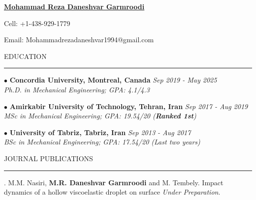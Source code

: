 \documentclass[11pt]{article}
\newcommand\tab[1][0.5cm]{\hspace*{#1}}
\begin{document}
	
	\noindent \href{https://mrdanesh.github.io/portfolio/}{{\textbf{Mohammad Reza Daneshvar Garmroodi}}} 
	
	\noindent Cell: +1-438-929-1779 
	
	\noindent Email: Mohammadrezadaneshvar1994@gmail.com 
	

	
	
	\vspace{3mm}
	
	
	\noindent EDUCATION
	
	\vspace{-2mm}
	
	\noindent\rule[0.5ex]{\linewidth}{1pt}
	
	
		{\noindent $\bullet$ \bf Concordia University, Montreal, Canada} \hfill {\em Sep 2019 - May 2025} 
		\\ \textit{Ph.D. in Mechanical Engineering; GPA: 4.1/4.3}
		
		\vspace{1.5mm}
		
		{\noindent $\bullet$ \bf Amirkabir University of Technology, Tehran, Iran} \hfill {\em Sep 2017 - Aug 2019} 
		\\ \textit{MSc in Mechanical Engineering; GPA: 19.54/20 (\textbf{Ranked 1st})}
	
		\vspace{1.5mm}
		
		{\noindent $\bullet$ \bf University of Tabriz, Tabriz, Iran} \hfill {\em Sep 2013 - Aug 2017} 
		\\ \textit{BSc in Mechanical Engineering; GPA: 17.54/20 (Last two years)}
		
		\vspace{2.5mm}
		
		\noindent JOURNAL PUBLICATIONS
		
		\vspace{-2mm}
		
		\noindent\rule[0.5ex]{\linewidth}{1pt}
		
		
		
		. {M.M. Nasiri, \textbf{M.R. Daneshvar Garmroodi} and M. Tembely. Impact dynamics of a hollow viscoelastic droplet on surface\textit{ Under Preparation}}.
		
\end{document}
